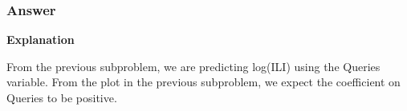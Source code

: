 \documentclass[letterpaper, 9pt, onecolumn, twoside, technote, final]{IEEEtran}
\begin{document}
\subsubsection{Answer}
\label{sec-3-4-1}

\textbf{Explanation}

From the previous subproblem, we are predicting log(ILI) using the
Queries variable. From the plot in the previous subproblem, we expect
the coefficient on Queries to be positive.
\end{document}
